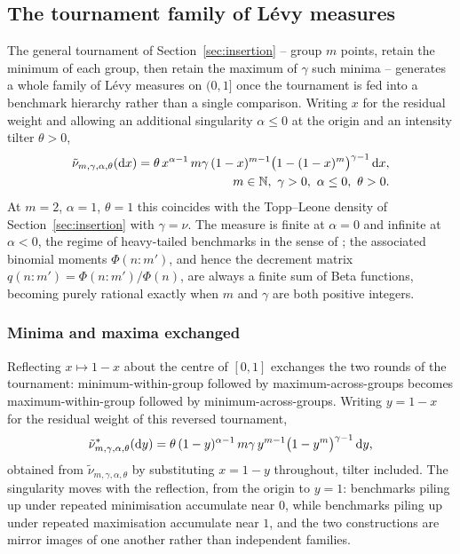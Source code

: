 \documentclass[11pt]{article}
\newcommand{\NN}{\mathbb{N}}
\theoremstyle{plain}
\theoremstyle{definition}
\begin{document}
\subsection{The tournament family of Lévy measures}

The general tournament of Section~\ref{sec:insertion} -- group \(m\) points, retain the minimum of each group, then retain the maximum of \(\gamma\) such minima -- generates a whole family of Lévy measures on \((0,1]\) once the tournament is fed into a benchmark hierarchy rather than a single comparison. Writing \(x\) for the residual weight and allowing an additional singularity \(\alpha\le0\) at the origin and an intensity tilter \(\theta>0\),
\begin{eqnarray}\nonumber
\tilde\nu_{m,\gamma,\alpha,\theta}({\rm d}x)
=\theta\,x^{\alpha-1}\,m\gamma\,(1-x)^{m-1}\bigl(1-(1-x)^m\bigr)^{\gamma-1}\,{\rm d}x,\\
\qquad 
m\in\NN,\ \gamma>0,\ \alpha\le0,\ \theta>0.
\end{eqnarray}
At \(m=2\), \(\alpha=1\), \(\theta=1\) this coincides with the Topp--Leone density of Section~\ref{sec:insertion} with \(\gamma=\nu\). The measure is finite at \(\alpha=0\) and infinite at \(\alpha<0\), the regime of heavy-tailed benchmarks in the sense of \cite{markovich2008}; the associated binomial moments \(\Phi(n:m')\), and hence the decrement matrix \(q(n:m')=\Phi(n:m')/\Phi(n)\), are always a finite sum of Beta functions, becoming purely rational exactly when \(m\) and \(\gamma\) are both positive integers.

\subsubsection{Minima and maxima exchanged} Reflecting \(x\mapsto1-x\) about the centre of \([0,1]\) exchanges the two rounds of the tournament: minimum-within-group followed by maximum-across-groups becomes maximum-within-group followed by minimum-across-groups. Writing \(y=1-x\) for the residual weight of this reversed tournament,
\[
\tilde\nu^*_{m,\gamma,\alpha,\theta}({\rm d}y)=\theta\,(1-y)^{\alpha-1}\,m\gamma\,y^{m-1}\bigl(1-y^m\bigr)^{\gamma-1}\,{\rm d}y,
\]
obtained from \(\tilde\nu_{m,\gamma,\alpha,\theta}\) by substituting \(x=1-y\) throughout, tilter included. The singularity moves with the reflection, from the origin to \(y=1\): benchmarks piling up under repeated minimisation accumulate near \(0\), while benchmarks piling up under repeated maximisation accumulate near \(1\), and the two constructions are mirror images of one another rather than independent families.
\end{document}
